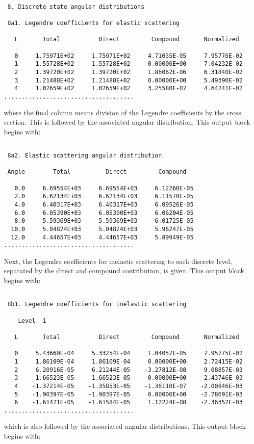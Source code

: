 \begin{samplecase}
{\small \begin{verbatim}

 8. Discrete state angular distributions

 8a1. Legendre coefficients for elastic scattering

   L       Total           Direct         Compound       Normalized

   0     1.75971E+02     1.75971E+02     4.71035E-05     7.95776E-02
   1     1.55728E+02     1.55728E+02     0.00000E+00     7.04232E-02
   2     1.39720E+02     1.39720E+02     1.86062E-06     6.31840E-02
   3     1.21488E+02     1.21488E+02     0.00000E+00     5.49390E-02
   4     1.02659E+02     1.02659E+02     3.25580E-07     4.64241E-02
.....................................
\end{verbatim} } \renewcommand{\baselinestretch}{1.07}\small\normalsize
\noindent
where the final column means division of the Legendre coefficients by the
cross section.
This is followed by the associated angular distribution. This output block 
begins with:

{\small \begin{verbatim}

 8a2. Elastic scattering angular distribution

 Angle        Total          Direct         Compound

   0.0     6.69554E+03     6.69554E+03     6.12260E-05
   2.0     6.62134E+03     6.62134E+03     6.11570E-05
   4.0     6.40317E+03     6.40317E+03     6.09526E-05
   6.0     6.05390E+03     6.05390E+03     6.06204E-05
   8.0     5.59369E+03     5.59369E+03     6.01725E-05
  10.0     5.04824E+03     5.04824E+03     5.96247E-05
  12.0     4.44657E+03     4.44657E+03     5.89949E-05
.....................................
\end{verbatim} } \renewcommand{\baselinestretch}{1.07}\small\normalsize
\noindent
Next, the Legendre coefficients for inelastic scattering to each discrete
level, separated by the direct and 
compound contribution, is given. This output block begins with:

{\small \begin{verbatim}

 8b1. Legendre coefficients for inelastic scattering
  
    Level  1
  
   L       Total           Direct         Compound       Normalized
  
   0     5.43660E-04     5.33254E-04     1.04057E-05     7.95775E-02
   1     1.86109E-04     1.86109E-04     0.00000E+00     2.72415E-02
   2     6.20916E-05     6.21244E-05    -3.27812E-08     9.08857E-03
   3     1.66523E-05     1.66523E-05     0.00000E+00     2.43746E-03
   4    -1.37214E-05    -1.35853E-05    -1.36110E-07    -2.00846E-03
   5    -1.90397E-05    -1.90397E-05     0.00000E+00    -2.78691E-03
   6    -1.61471E-05    -1.61584E-05     1.12224E-08    -2.36352E-03
.....................................
\end{verbatim} } \renewcommand{\baselinestretch}{1.07}\small\normalsize
\noindent
which is also followed by the associated angular distributions. This output 
block begins with:


\end{samplecase}
